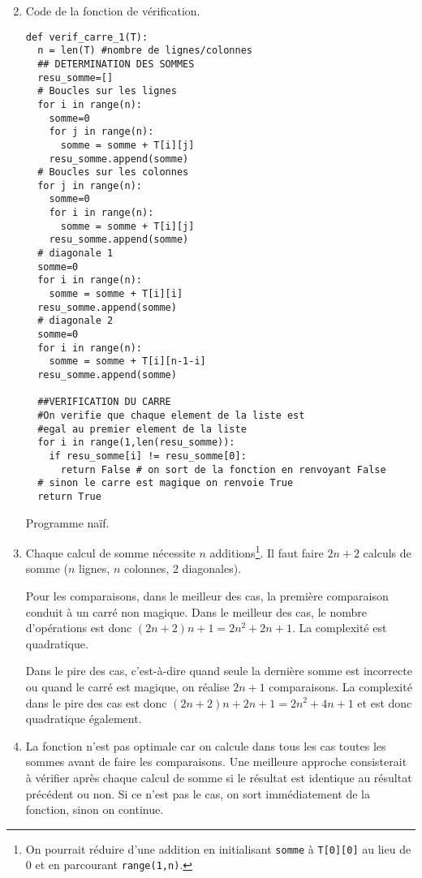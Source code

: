 \begin{enumerate}
\setcounter{enumi}{1}
\item Code de la fonction de vérification.

\begin{listing}
\begin{verbatim}
def verif_carre_1(T):
  n = len(T) #nombre de lignes/colonnes
  ## DETERMINATION DES SOMMES
  resu_somme=[]
  # Boucles sur les lignes
  for i in range(n):
    somme=0
    for j in range(n):
      somme = somme + T[i][j]
    resu_somme.append(somme)
  # Boucles sur les colonnes
  for j in range(n):
    somme=0
    for i in range(n):
      somme = somme + T[i][j]
    resu_somme.append(somme)
  # diagonale 1
  somme=0
  for i in range(n):
    somme = somme + T[i][i]
  resu_somme.append(somme)
  # diagonale 2
  somme=0
  for i in range(n):
    somme = somme + T[i][n-1-i]
  resu_somme.append(somme)

  ##VERIFICATION DU CARRE
  #On verifie que chaque element de la liste est
  #egal au premier element de la liste
  for i in range(1,len(resu_somme)):
    if resu_somme[i] != resu_somme[0]:
      return False # on sort de la fonction en renvoyant False
  # sinon le carre est magique on renvoie True
  return True
\end{verbatim}
\caption{Programme naïf.}
\label{prog:factorielle}
\end{listing}

\item Chaque calcul de somme nécessite $n$ additions\footnote{On pourrait réduire d'une addition en initialisant \texttt{somme} à \texttt{T[0][0]} au lieu de 0 et en parcourant \texttt{range(1,n)}.}. Il faut faire $2n+2$ calculs de somme ($n$ lignes, $n$ colonnes, 2 diagonales). 

Pour les comparaisons, dans le meilleur des cas, la première comparaison conduit à un carré non magique. 
Dans le meilleur des cas, le nombre d'opérations est donc $(2n+2)n+1=2n^2 + 2n + 1$. La complexité est quadratique.

Dans le pire des cas, c'est-à-dire quand seule la dernière somme est incorrecte ou quand le carré est magique, on réalise $2n+1$ comparaisons. La complexité dans le pire des cas est donc $(2n+2)n+2n+1=2n^2+4n+1$ et est donc quadratique également.

\newpage
\item La fonction n'est pas optimale car on calcule dans tous les cas toutes les sommes avant de faire les comparaisons. Une meilleure approche consisterait à vérifier après chaque calcul de somme si le résultat est identique au résultat précédent ou non. Si ce n'est pas le cas, on sort immédiatement de la fonction, sinon on continue.


\end{enumerate}

